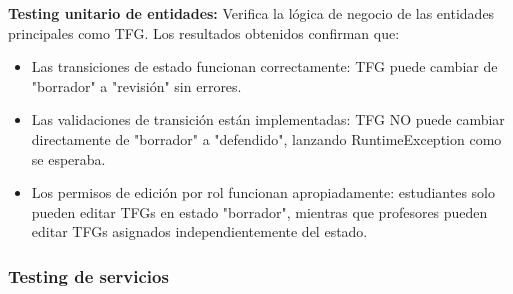 \documentclass[12pt,a4paper,oneside]{report}
\begin{document}
\textbf{Testing unitario de entidades:} Verifica la lógica de negocio de las entidades principales como TFG. Los resultados obtenidos confirman que:
\begin{itemize}
\item Las transiciones de estado funcionan correctamente: TFG puede cambiar de "borrador" a "revisión" sin errores.
\item Las validaciones de transición están implementadas: TFG NO puede cambiar directamente de "borrador" a "defendido", lanzando RuntimeException como se esperaba.
\item Los permisos de edición por rol funcionan apropiadamente: estudiantes solo pueden editar TFGs en estado "borrador", mientras que profesores pueden editar TFGs asignados independientemente del estado.
\end{itemize}

\subsubsection{Testing de servicios}\label{testing-de-servicios}
\end{document}
